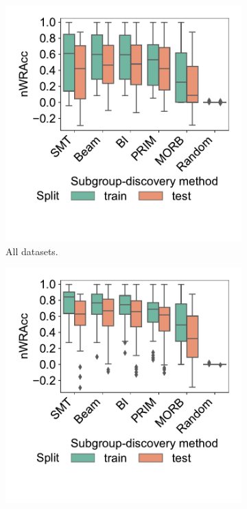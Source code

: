 \documentclass{article}
\theoremstyle{definition}
\begin{document}
\begin{figure}[t]
	\centering
	\begin{subfigure}[t]{0.48\textwidth}
		\centering
		\includegraphics[width=\textwidth, trim=20 60 15 15, clip]{plots/csd-unconstrained-methods-nwracc-all-datasets.pdf}
		\caption{All datasets.}
		\label{fig:csd:unconstrained-methods-nwracc-all-datasets}
	\end{subfigure}
	\hfill
	\begin{subfigure}[t]{0.48\textwidth}
		\centering
		\includegraphics[width=\textwidth, trim=20 60 15 15, clip]{plots/csd-unconstrained-methods-nwracc-no-timeout-datasets.pdf}

\end{subfigure}
\end{figure}
\end{document}
